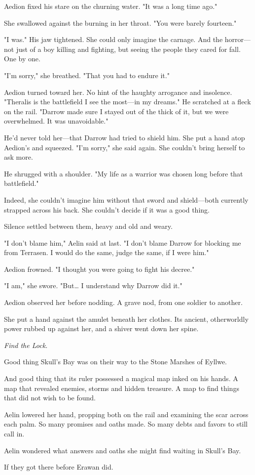 Aedion fixed his stare on the churning water. "It was a long time ago."

She swallowed against the burning in her throat. "You were barely fourteen."

"I was." His jaw tightened. She could only imagine the carnage. And the horror---not just of a boy killing and fighting, but seeing the people they cared for fall. One by one.

"I'm sorry," she breathed. "That you had to endure it."

Aedion turned toward her. No hint of the haughty arrogance and insolence. "Theralis is the battlefield I see the most---in my dreams." He scratched at a fleck on the rail. "Darrow made sure I stayed out of the thick of it, but we were overwhelmed. It was unavoidable."

He'd never told her---that Darrow had tried to shield him. She put a hand atop Aedion's and squeezed. "I'm sorry," she said again. She couldn't bring herself to ask more.

He shrugged with a shoulder. "My life as a warrior was chosen long before that battlefield."

Indeed, she couldn't imagine him without that sword and shield---both currently strapped across his back. She couldn't decide if it was a good thing.

Silence settled between them, heavy and old and weary.

"I don't blame him," Aelin said at last. "I don't blame Darrow for blocking me from Terrasen. I would do the same, judge the same, if I were him."

Aedion frowned. "I thought you were going to fight his decree."

"I am," she swore. "But\ldots{} I understand why Darrow did it."

Aedion observed her before nodding. A grave nod, from one soldier to another.

She put a hand against the amulet beneath her clothes. Its ancient, otherworldly power rubbed up against her, and a shiver went down her spine.

\emph{Find the Lock.}

Good thing Skull's Bay was on their way to the Stone Marshes of Eyllwe.

And good thing that its ruler possessed a magical map inked on his hands. A map that revealed enemies, storms  and hidden treasure. A map to find things that did not wish to be found.

Aelin lowered her hand, propping both on the rail and examining the scar across each palm. So many promises and oaths made. So many debts and favors to still call in.

Aelin wondered what answers and oaths she might find waiting in Skull's Bay.

If they got there before Erawan did.
